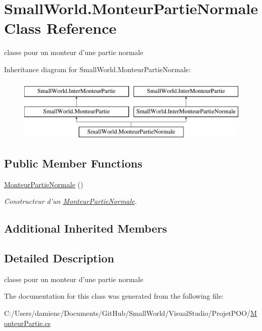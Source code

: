 \hypertarget{class_small_world_1_1_monteur_partie_normale}{\section{Small\-World.\-Monteur\-Partie\-Normale Class Reference}
\label{class_small_world_1_1_monteur_partie_normale}
}


classe pour un monteur d'une partie normale  


Inheritance diagram for Small\-World.\-Monteur\-Partie\-Normale\-:\begin{figure}[H]
\begin{center}
\leavevmode
\includegraphics[height=3.000000cm]{class_small_world_1_1_monteur_partie_normale}
\end{center}
\end{figure}
\subsection*{Public Member Functions}
\begin{DoxyCompactItemize}
\item 
\hypertarget{class_small_world_1_1_monteur_partie_normale_a820373704794c419c695decc1e4e63f0}{\hyperlink{class_small_world_1_1_monteur_partie_normale_a820373704794c419c695decc1e4e63f0}{Monteur\-Partie\-Normale} ()}\label{class_small_world_1_1_monteur_partie_normale_a820373704794c419c695decc1e4e63f0}

\begin{DoxyCompactList}\small\item\em Constructeur d'un \hyperlink{class_small_world_1_1_monteur_partie_normale}{Monteur\-Partie\-Normale}. \end{DoxyCompactList}\end{DoxyCompactItemize}
\subsection*{Additional Inherited Members}


\subsection{Detailed Description}
classe pour un monteur d'une partie normale 

The documentation for this class was generated from the following file\-:\begin{DoxyCompactItemize}
\item 
C\-:/\-Users/damienc/\-Documents/\-Git\-Hub/\-Small\-World/\-Visual\-Studio/\-Projet\-P\-O\-O/\hyperlink{_monteur_partie_8cs}{Monteur\-Partie.\-cs}\end{DoxyCompactItemize}
